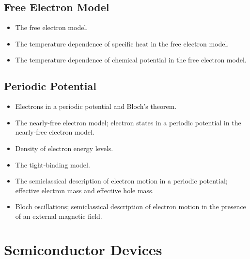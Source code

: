 \subsection{Free Electron Model}

\begin{itemize}

    \item The free electron model.

    \item The temperature dependence of specific heat in the free electron model.

    \item The temperature dependence of chemical potential in the free electron model.

\end{itemize}

\subsection{Periodic Potential}
\begin{itemize}

    \item Electrons in a periodic potential and Bloch's theorem.

    \item The nearly-free electron model; 
    electron states in a periodic potential in the nearly-free electron model.

    \item Density of electron energy levels.

    \item The tight-binding model.

    \item The semiclassical description of electron motion in a periodic potential; effective electron mass and effective hole mass.

    \item Bloch oscillations; semiclassical description of electron motion in the presence of an external magnetic field.

\end{itemize}


\section{Semiconductor Devices}

